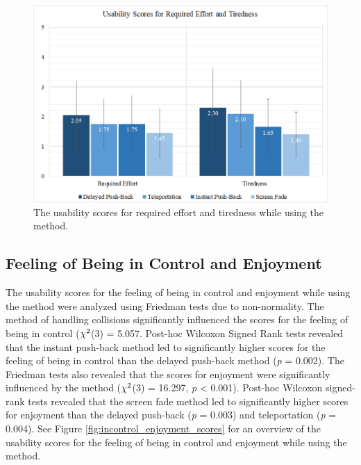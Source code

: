 \begin{figure}[ph]
\centering
\includegraphics[width=1\textwidth]{img/effort_tiredness_scores.png}
\caption{The usability scores for required effort and tiredness while using the method.}
\label{fig:effort_tiredness_scores}
\end{figure}

\subsection{Feeling of Being in Control and Enjoyment}

The usability scores for the feeling of being in control and enjoyment while using the method were analyzed using Friedman tests due to non-normality. The method of handling collisions significantly influenced the scores for the feeling of being in control (\textit{$\chi\textsuperscript{2}$}(3) = 5.057. Post-hoc Wilcoxon Signed Rank tests revealed that the instant push-back method led to significantly higher scores for the feeling of being in control than the delayed push-back method (\textit{p} = 0.002). The Friedman tests also revealed that the scores for enjoyment were significantly influenced by the method (\textit{$\chi\textsuperscript{2}$}(3) = 16.297, \textit{p} < 0.001). Post-hoc Wilcoxon signed-rank tests revealed that the screen fade method led to significantly higher scores for enjoyment than the delayed push-back (\textit{p} = 0.003) and teleportation (\textit{p} = 0.004). See Figure \ref{fig:incontrol_enjoyment_scores} for an overview of the usability scores for the feeling of being in control and enjoyment while using the method.

